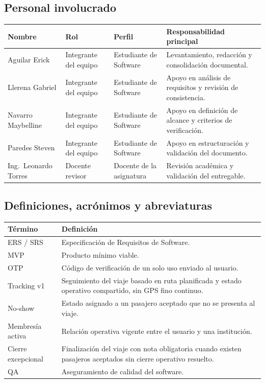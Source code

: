 \documentclass[12pt]{article}
\begin{document}
\subsection{Personal involucrado}

\begin{longtable}{|P{3.2cm}|P{3.2cm}|P{3.3cm}|P{4.7cm}|}
\hline
{}
\textbf{Nombre} & \textbf{Rol} & \textbf{Perfil} & \textbf{Responsabilidad principal} \\
\hline
Aguilar Erick & Integrante del equipo & Estudiante de Software & Levantamiento, redacci\'on y consolidaci\'on documental. \\
\hline
Llerena Gabriel & Integrante del equipo & Estudiante de Software & Apoyo en an\'alisis de requisitos y revisi\'on de consistencia. \\
\hline
Navarro Maybelline & Integrante del equipo & Estudiante de Software & Apoyo en definici\'on de alcance y criterios de verificaci\'on. \\
\hline
Paredes Steven & Integrante del equipo & Estudiante de Software & Apoyo en estructuraci\'on y validaci\'on del documento. \\
\hline
Ing.\ Leonardo Torres & Docente revisor & Docente de la asignatura & Revisi\'on acad\'emica y validaci\'on del entregable. \\
\hline
\end{longtable}

\subsection{Definiciones, acr\'onimos y abreviaturas}

\begin{longtable}{|P{3.2cm}|P{11.2cm}|}
\hline
{}
\textbf{T\'ermino} & \textbf{Definici\'on} \\
\hline
ERS / SRS & Especificaci\'on de Requisitos de Software. \\
\hline
MVP & Producto m\'inimo viable. \\
\hline
OTP & C\'odigo de verificaci\'on de un solo uso enviado al usuario. \\
\hline
Tracking v1 & Seguimiento del viaje basado en ruta planificada y estado operativo compartido, sin GPS fino continuo. \\
\hline
No-show & Estado asignado a un pasajero aceptado que no se presenta al viaje. \\
\hline
Membres\'ia activa & Relaci\'on operativa vigente entre el usuario y una instituci\'on. \\
\hline
Cierre excepcional & Finalizaci\'on del viaje con nota obligatoria cuando existen pasajeros aceptados sin cierre operativo resuelto. \\
\hline
QA & Aseguramiento de calidad del software. \\
\hline
\end{longtable}
\end{document}
